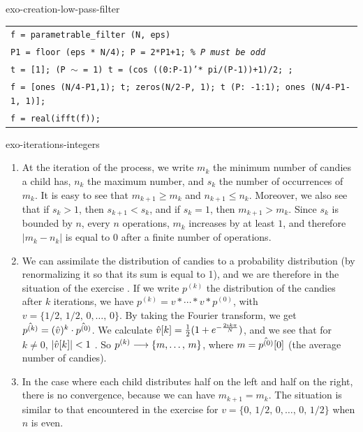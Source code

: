 \begin{correction}{exo-creation-low-pass-filter}
\begin{enumerate}
\begin{listing} \begin{footnotesize} 
{\upshape
\begin{tabular}{l} \texttt{\pfunction f = parametrable\_filter (N, eps)} \\
\texttt{P1 = floor (eps * N/4); P = 2*P1+1; \textit{\% P must be odd}} \\
\texttt{t = [1]; \pif{} (P $ \sim $ = 1) t = (cos ((0:P-1)'* pi/(P-1))+1)/2; \pend{};} \\
\texttt{f = [ones (N/4-P1,1); t; zeros(N/2-P, 1); t (P: -1:1); ones (N/4-P1-1, 1)];} \\
\texttt{f = real(ifft(f));} \\
\end{tabular}
}
\end{footnotesize} 
\caption{Procedure \texttt{\upshape parametrable\_filter}}
\label{configurable-filter-listing}
\end{listing}
\end{enumerate}
\end{correction}
 
 
\begin{correction}{exo-iterations-integers}
\begin{enumerate}
\item At the  iteration of the process, we write $ m_k $ the minimum number of candies a child has, $ n_k $ the maximum number, and $ s_k $ the number of occurrences of $ m_k $. It is easy to see that $ m_{k+1} \geq m_{k} $ and $ n_{k+1} \leq n_k $. Moreover, we also see that if $ s_k> 1 $, then $ s_{k+1} <s_k $, and if $ s_k = 1 $, then $ m_{k+1}> m_k $. Since $ s_k $ is bounded by $ n $, every $ n $ operations, $ m_k $ increases by at least $ 1 $, and therefore $ | m_k-n_k | $ is equal to 0 after a finite number of operations.
\item We can assimilate the distribution of candies to a probability distribution (by renormalizing it so that its sum is equal to 1), and we are therefore in the situation of the exercise . If we write $ p^{(k)} $ the distribution of the candies after $ k $ iterations, we have $ p^{(k)} = v * \cdots * v * p^{(0)} $, with $ v = \{1/2, \, 1/2, \, 0, \ldots, \, 0\} $. By taking the Fourier transform, we get $ \hat{p^{(k)}} = (\hat{v})^k \cdot \hat{p^{(0)}} $. We calculate $ \hat{v}[k] = \frac{1}{2} (1 + e^{- \frac{2 \imath k \pi}{N}}) $, and we see that for $ k \neq 0 $, $ | \hat{v}[k] | < 1$ . So $ p^{(k)} \overset{}{\longrightarrow} \{m, \ldots, \, m\} $, where $ m = \hat{p^{(0)}}[0] $ (the average number of candies).
\item In the case where each child distributes half on the left and half on the right, there is no convergence, because we can have $ m_{k+1} = m_k $. The situation is similar to that encountered in the  exercise for $ v = \{0, \, 1/2, \, 0, \ldots, \, 0, \, 1/2\} $ when $ n $ is even.
\end{enumerate}
\end{correction}
 

